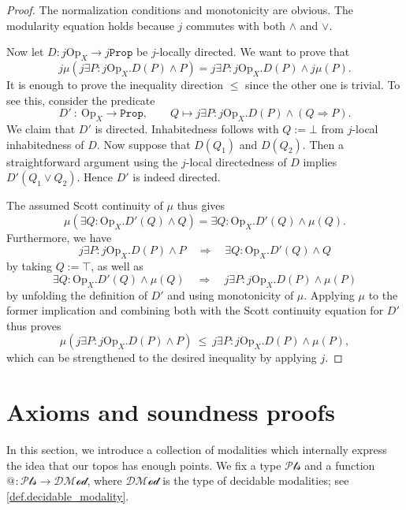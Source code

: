 \documentclass[11pt, oneside, article]{memoir}
\makeatletter
\theoremstyle{plain}
\theoremstyle{definition}
\theoremstyle{remark}
\newcommand{\const}[1]{\mathtt{#1}}
\newcommand{\Set}[1]{\mathrm{#1}}
\newcommand{\prop}{\const{Prop}}
\newcommand{\Op}{\Set{Op}}
\newcommand{\pt}{k}				%
\newcommand{\Pts}{\mathcal{Pts}}		%
\newcommand{\decmod}{\mathcal{DMod}}
\newcommand{\AtSymbol}{{@}}
\newcommand{\At}[1][\pt]{\AtSymbol_{#1}}
\newcommand{\imp}{\Rightarrow}
\makeatother
\begin{document}
\begin{proof}
	The normalization conditions and monotonicity are obvious. The modularity equation holds because $j$ commutes with both $\land$ and $\lor$.

	Now let $D : j \Op_X \longrightarrow j \prop$ be $j$-locally directed. We want to prove that
	\[
		j \mu\left( j \exists P : j \Op_X . D(P) \land P \right) = j \exists P : j \Op_X . D(P) \land j \mu(P).
	\]
	It is enough to prove the inequality direction $\le$ since the other one is trivial. To see this, consider the predicate
	\[
		D' \: : \: \Op_X \longrightarrow \prop, \qquad Q \longmapsto j \exists P : j \Op_X . D(P) \land (Q \imp P).
	\]
	We claim that $D'$ is directed. Inhabitedness follows with $Q := \bot$ from $j$-local inhabitedness of $D$. Now suppose that $D(Q_1)$ and $D(Q_2)$. Then a straightforward argument using the $j$-local directedness of $D$ implies $D'(Q_1 \lor Q_2)$. Hence $D'$ is indeed directed.

	The assumed Scott continuity of $\mu$ thus gives
	\[
		\mu\left( \exists Q : \Op_X . D'(Q) \land Q \right) = \exists Q : \Op_X . D'(Q) \land \mu(Q).
	\]
	Furthermore, we have
	\[
		j \exists P : j \Op_X . D(P) \land P \quad \Longrightarrow \quad \exists Q : \Op_X . D'(Q) \land Q
	\]
	by taking $Q := \top$, as well as
	\[
		\exists Q : \Op_X . D'(Q) \land \mu(Q) \quad \Longrightarrow \quad j \exists P : j \Op_X . D(P) \land \mu(P)
	\]
	by unfolding the definition of $D'$ and using monotonicity of $\mu$. Applying $\mu$ to the former implication and combining both with the Scott continuity equation for $D'$ thus proves
	\[
		\mu\left( j \exists P : j \Op_X . D(P) \land P \right) \: \le \: j \exists P : j \Op_X . D(P) \land \mu(P),
	\]
	which can be strengthened to the desired inequality by applying $j$.
\end{proof}

\chapter{Axioms and soundness proofs}

In this section, we introduce a collection of modalities which internally express the idea that our topos has enough points. We fix a type $\Pts$ and a function $\At[]\colon\Pts\to\decmod$, where $\decmod$ is the type of decidable modalities; see \cref{def.decidable_modality}. 
\end{document}

